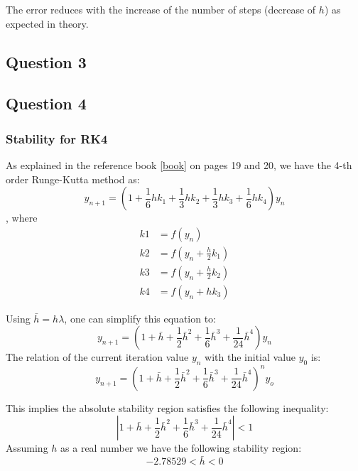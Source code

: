 \documentclass[a4paper, 11pt]{article}
\begin{document}
		The error reduces with the increase of the number of steps (decrease of $h$) as expected in theory.		
		
		\subsection*{Question 3}
		
		
		\subsection*{Question 4}
			\subsubsection*{Stability for RK4}
				As explained in the reference book \ref{book} on pages 19 and 20, we have the 4-th order Runge-Kutta method as:
				\begin{equation}
					y_{n+1} = (1 + \frac{1}{6}hk_1 + \frac{1}{3}hk_2 + \frac{1}{3}hk_3 + \frac{1}{6}hk_4)y_n
				\end{equation}
				, where
				\begin{align}
						k1 &= f(y_{n}) \\
						k2 &= f(y_{n} + \frac{h}{2} k_1) \\
						k3 &= f(y_{n} + \frac{h}{2} k_2) \\
						k4 &= f(y_{n} + h k_3)
					\end{align}
			
				Using $ \bar{h} = h\lambda $, one can simplify this equation to:
				\begin{equation}
					y_{n+1} = (1 + \bar{h} + \frac{1}{2}\bar{h}^2 + \frac{1}{6}\bar{h}^3 + \frac{1}{24}\bar{h}^4)y_n
				\end{equation}
				The relation of the current iteration value $y_n$ with the initial value $y_0$ is:
				\begin{equation}
					y_{n+1} = (1 + \bar{h} + \frac{1}{2}\bar{h}^2 + \frac{1}{6}\bar{h}^3 + \frac{1}{24}\bar{h}^4)^n y_o
				\end{equation}
			
				This implies the absolute stability region satisfies the following inequality:
				\begin{equation}
					|1 + \bar{h} + \frac{1}{2}\bar{h}^2 + \frac{1}{6}\bar{h}^3 + \frac{1}{24}\bar{h}^4| < 1 
				\end{equation}
				Assuming $h$ as a real number we have the following stability region:
				\begin{equation}
					-2.78529 < \bar{h} < 0
				\end{equation}
				
\end{document}
